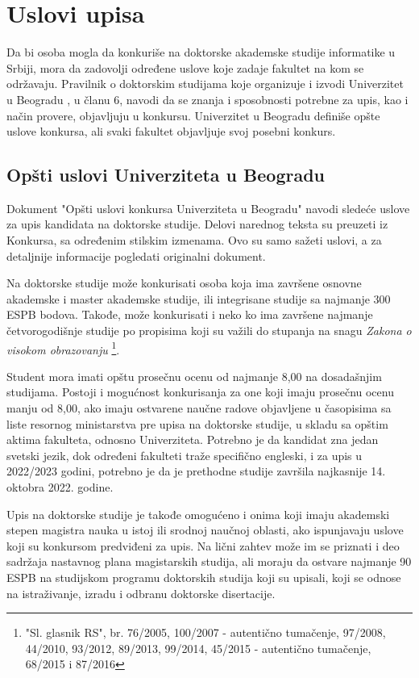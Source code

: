 \documentclass[a4paper]{article}
\begin{document}
\section{Uslovi upisa}
\label{sec:uslovi}

Da bi osoba mogla da konkuriše na doktorske akademske studije informatike u Srbiji, mora da zadovolji određene uslove koje zadaje fakultet na kom se održavaju. Pravilnik o doktorskim studijama koje organizuje i izvodi Univerzitet u Beogradu \cite{pravilnik}, u članu 6, navodi da se znanja i sposobnosti potrebne za upis, kao i način provere, objavljuju u konkursu. Univerzitet u Beogradu definiše opšte uslove konkursa, ali svaki fakultet objavljuje svoj posebni konkurs. 

\subsection{Opšti uslovi Univerziteta u Beogradu}

Dokument "Opšti uslovi konkursa Univerziteta u Beogradu"{} \cite{konkursBeograd} navodi sledeće uslove za upis kandidata na doktorske studije. Delovi narednog teksta su preuzeti iz Konkursa, sa određenim stilskim izmenama. Ovo su samo sažeti uslovi, a za detaljnije informacije pogledati originalni dokument. 

Na doktorske studije može konkurisati osoba koja ima završene osnovne akademske i master akademske studije, ili integrisane studije sa najmanje 300 ESPB bodova. Takođe, može konkurisati i neko ko ima završene najmanje četvorogodišnje studije po propisima koji su važili do stupanja na snagu \emph{Zakona o visokom obrazovanju} \footnote{"Sl. glasnik RS", br. 76/2005, 100/2007 - autentično tumačenje, 97/2008, 44/2010, 93/2012, 89/2013, 99/2014, 45/2015 - autentično tumačenje, 68/2015 i 87/2016}. 

Student mora imati opštu prosečnu ocenu od najmanje 8,00 na dosadašnjim studijama. Postoji i mogućnost konkurisanja za one koji imaju prosečnu ocenu manju od 8,00, ako imaju ostvarene naučne radove objavljene u časopisima sa liste resornog ministarstva pre upisa na doktorske studije, u skladu sa opštim aktima fakulteta, odnosno Univerziteta. Potrebno je da kandidat zna jedan svetski jezik, dok određeni fakulteti traže specifično engleski, i za upis u 2022/2023 godini, potrebno je da je prethodne studije završila najkasnije 14. oktobra 2022. godine. 

Upis na doktorske studije je takođe omogućeno i onima koji imaju akademski stepen magistra nauka u istoj ili srodnoj naučnoj oblasti, ako ispunjavaju uslove koji su konkursom predviđeni za upis. Na lični zahtev može im se priznati i deo sadržaja nastavnog plana magistarskih studija, ali moraju da ostvare najmanje 90 ESPB na studijskom programu doktorskih studija koji su upisali, koji se odnose na istraživanje, izradu i odbranu doktorske disertacije. 
\end{document}
